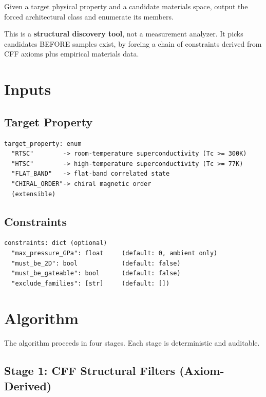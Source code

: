 \documentclass[11pt, a4paper]{article}
\begin{document}
Given a target physical property and a candidate materials space,
output the forced architectural class and enumerate its members.

This is a \textbf{structural discovery tool}, not a measurement
analyzer. It picks candidates BEFORE samples exist, by forcing a
chain of constraints derived from CFF axioms plus empirical
materials data.

\section{Inputs}

\subsection{Target Property}

\begin{lstlisting}
target_property: enum
  "RTSC"        -> room-temperature superconductivity (Tc >= 300K)
  "HTSC"        -> high-temperature superconductivity (Tc >= 77K)
  "FLAT_BAND"   -> flat-band correlated state
  "CHIRAL_ORDER"-> chiral magnetic order
  (extensible)
\end{lstlisting}

\subsection{Constraints}

\begin{lstlisting}
constraints: dict (optional)
  "max_pressure_GPa": float     (default: 0, ambient only)
  "must_be_2D": bool            (default: false)
  "must_be_gateable": bool      (default: false)
  "exclude_families": [str]     (default: [])
\end{lstlisting}

\section{Algorithm}

The algorithm proceeds in four stages. Each stage is deterministic
and auditable.

\subsection{Stage 1: CFF Structural Filters (Axiom-Derived)}
\end{document}
